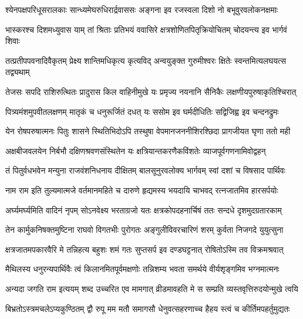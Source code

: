 \fourlineindentedshloka
{श्येनपक्षपरिधूसरालकाः}
{सान्ध्यमेघरुधिरार्द्रवाससः}
{अङ्गना इव रजस्वला दिशो}
{नो बभूवुरवलोकनक्षमाः} %

\fourlineindentedshloka
{भास्करश्च दिशमध्युवास याम्}
{तां श्रिताः प्रतिभयं ववासिरे}
{क्षत्रशोणितपितृक्रियोचितम्}
{चोदयन्त्य इव भार्गवं शिवाः} %

\fourlineindentedshloka
{तत्प्रतीपपवनादिवैकृतम्}
{प्रेक्ष्य शान्तिमधिकृत्य कृत्यविद्}
{अन्वयुङ्क्त गुरुमीश्वरः क्षितेः}
{स्वन्तमित्यलघयत्स तद्व्यथाम्} %

\fourlineindentedshloka
{तेजसः सपदि राशिरुत्थितः}
{प्रादुरास किल वाहिनीमुखे}
{यः प्रमृज्य नयनानि सैनिकैः}
{लक्षणीयपुरुषाकृतिश्चिरात्} %

\fourlineindentedshloka
{पित्र्यमंशमुपवीतलक्षणम्}
{मातृकं च धनुरूर्जितं दधत्}
{यः ससोम इव घर्मदीधितिः}
{सद्विजिह्व इव चन्दनद्रुमः} %

\fourlineindentedshloka
{येन रोषपरुषात्मनः पितुः}
{शासने स्थितिभिदोऽपि तस्थुषा}
{वेपमानजननीशिरश्छिदा}
{प्रागजीयत घृणा ततो मही} %

\fourlineindentedshloka
{अक्षबीजवलयेन निर्बभौ}
{दक्षिणश्रवणसंस्थितेन यः}
{क्षत्रियान्तकरणैकविंशतेः}
{व्याजपूर्वगणनामिवोद्वहन्} %

\fourlineindentedshloka
{तं पितुर्वधभवेन मन्युना}
{राजवंशनिधनाय दीक्षितम्}
{बालसूनुरवलोक्य भार्गवम्}
{स्वां दशां च विषसाद पार्थिवः} %

\fourlineindentedshloka
{नाम राम इति तुल्यमात्मजे}
{वर्तमानमहिते च दारुणे}
{हृद्यमस्य भयदायि चाभवद्}
{रत्नजातमिव हारसर्पयोः} %

\fourlineindentedshloka
{अर्घ्यमर्घ्यमिति वादिनं नृपम्}
{सोऽनवेक्ष्य भरताग्रजो यतः}
{क्षत्रकोपदहनार्चिषं ततः}
{सन्दधे दृशमुदग्रतारकाम्} %

\fourlineindentedshloka
{तेन कार्मुकनिषक्तमुष्टिना}
{राघवो विगतभीः पुरोगतः}
{अङ्गुलीविवरचारिणं शरम्}
{कुर्वता निजगदे युयुत्सुना} %

\fourlineindentedshloka
{क्षत्रजातमपकारवैरि मे}
{तन्निहत्य बहुशः शमं गतः}
{सुप्तसर्प इव दण्डघट्टनात्}
{रोषितोऽस्मि तव विक्रमश्रवात्} %

\fourlineindentedshloka
{मैथिलस्य धनुरन्यपार्थिवैः}
{त्वं किलानमितपूर्वमक्षणोः}
{तन्निशम्य भवता समर्थये}
{वीर्यशृङ्गमिव भग्नमात्मनः} %

\fourlineindentedshloka
{अन्यदा जगति राम इत्ययम्}
{शब्द उच्चरित एव मामगात्}
{व्रीडमावहति मे स सम्प्रति}
{व्यस्तवृत्तिरुदयोन्मुखे त्वयि} %

\fourlineindentedshloka
{बिभ्रतोऽस्त्रमचलेऽप्यकुण्ठितम्}
{द्वौ रुपू मम मतौ समागसौ}
{धेनुवत्सहरणाच्च हैहय}
{स्त्वं च कीर्तिमपहर्तुमुद्यतः} %

